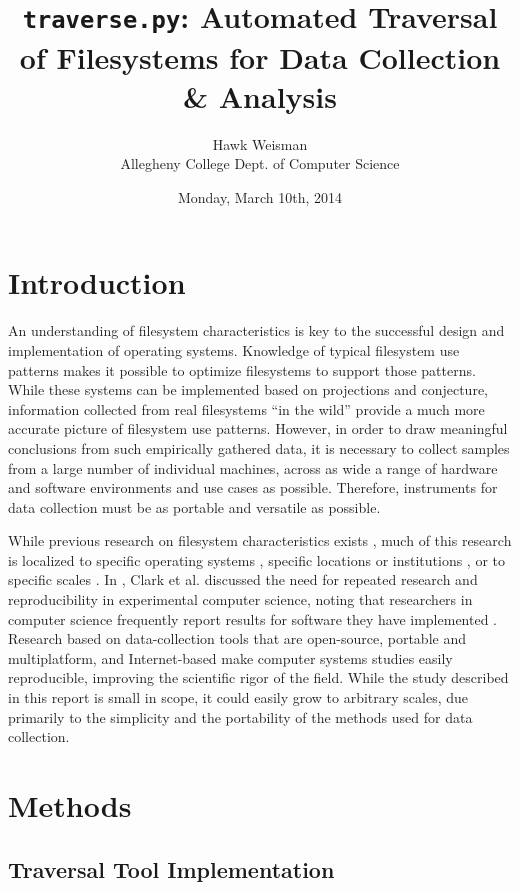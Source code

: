 \documentclass[12pt,letterpaper]{article}
\author{Hawk Weisman\\Allegheny College Dept. of Computer Science}
\title{\texttt{traverse.py}: Automated Traversal of Filesystems for Data Collection \& Analysis}
\date{Monday, March 10th, 2014}
\begin{document}
	\maketitle
	\tableofcontents
	\pagebreak
	\section{Introduction}
		
		An understanding of filesystem characteristics is key to the successful design and implementation of operating systems. Knowledge of typical filesystem use patterns makes it possible to optimize filesystems to support those patterns. While these systems can be implemented based on projections and conjecture, information collected from real filesystems ``in the wild'' provide a much more accurate picture of filesystem use patterns. However, in order to draw meaningful conclusions from such empirically gathered data, it is necessary to collect samples from a large number of individual machines, across as wide a range of hardware and software environments and use cases as possible. Therefore, instruments for data collection must be as portable and versatile as possible.

		While previous research on filesystem characteristics exists \cite{agrawal2007five,evans2002study,leung2008measurement}, much of this research is localized to specific operating systems \cite{agrawal2007five}, specific locations or institutions \cite{agrawal2007five,evans2002study}, or to specific scales \cite{leung2008measurement}. In \citeyear{clark2004xen}, Clark et al. discussed the need for repeated research and reproducibility in experimental computer science, noting that researchers in computer science frequently report results for software they have implemented \cite{clark2004xen}. Research based on data-collection tools that are open-source, portable and multiplatform, and Internet-based make computer systems studies easily reproducible, improving the scientific rigor of the field. While the study described in this report is small in scope, it could easily grow to arbitrary scales, due primarily to the simplicity and the portability of the methods used for data collection.

	\section{Methods}

		\subsection{Traversal Tool Implementation}
\end{document}
